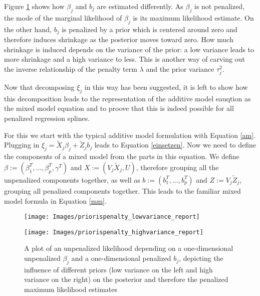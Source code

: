 \documentclass[12pt]{article}
\begin{document}
Figure \ref{priorispenalty} shows how $\beta_j$ and $b_j$ are estimated differently. As $\beta_j$ is not penalized, the mode of the marginal likelihood of $\beta_j$ is its maximum likelihood estimate. On the other hand, $b_j$ is penalized by a prior which is centered around zero and therefore induces shrinkage as the posterior moves toward zero. How much shrinkage is induced depends on the variance of the prior: a low variance leads to more shrinkage and a high variance to less. This is another way of carving out the inverse relationship of the penalty term $\lambda$ and the prior variance $\tau^2_j$.



Now that decomposing $\xi_j$ in this way has been suggested, it is left to show how this decomposition leads to the representation of the additive model eauqtion as the mixed model equation and to proove that this is indeed possible for all penalized regression splines.

For this we start with the typical additive model formulation with Equation \ref{am}. Plugging in 
$\xi_j = \tilde{X}_j \beta_j + \tilde{Z}_j b_j$ leads to Equation \ref{einsetzen}. Now we need to define the components of a mixed model from the parts in this equation. We define $\beta := (\beta_1^T,..., \beta_p^T, \gamma^T)$ and $X := (V_j \tilde{X}_j, U)$, therefore grouping all the unpenalized components together, as well as $b := (b_1^T,...,b_p^T)$ and $Z := V_j \tilde{Z}_j$, grouping all penalized components together. This leads to the familiar mixed model formula in Equation \ref{mm}. 

\begin{figure}[h]
\vspace{2em}
\centering
\hspace{-5.5em}
\begin{minipage}{.5\textwidth}
  \centering
  \texttt{[image: Images/priorispenalty\_lowvariance\_report]}
\end{minipage}%
\hspace{-2em}
\begin{minipage}{.5\textwidth}
  \centering
  \texttt{[image: Images/priorispenalty\_highvariance\_report]}
\end{minipage}
\vspace{-1em}
\caption[caption]{A plot of an unpenalized likelihood depending on a one-dimensional unpenalized $\beta_j$ and a one-dimensional penalized $b_j$, depicting the influence of different priors (low variance on the left and high variance on the right) on the posterior and therefore the penalized maximum likelihood estimates}\label{priorispenalty}
\end{figure}
\end{document}
